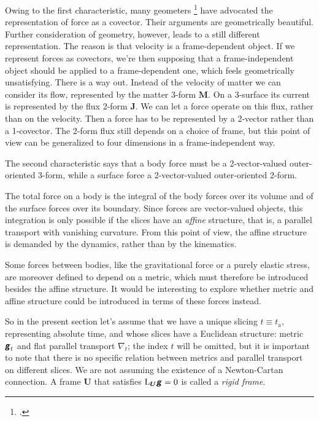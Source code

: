 \documentclass[\ifafour a4paper,12pt,\else a5paper,10pt,\fi%
onecolumn,oneside,article,%
british%
]{memoir}
\theoremstyle{remark}
\theoremstyle{innote}
\newcommand*{\mathte}[1]{\textbf{\textit{\textsf{#1}}}}
\newcommand*{\citep}{\footcites}
\renewcommand*{\|}[1][]{\nonscript\,#1\vert\nonscript\;\mathopen{}}
\newcommand*{\Li}{\mathrm{L}}
\newcommand*{\yrr}{M}
\newcommand*{\yr}{\bm{\yrr}}
\newcommand*{\ytn}{t_{\textrm{a}}}
\newcommand*{\yjj}{J}
\newcommand*{\yj}{\bm{\yjj}}
\newcommand*{\yFF}{U}
\newcommand*{\yF}{\bm{\yFF}}
\newcommand*{\ygg}{g}
\newcommand*{\yg}{\mathte{\ygg}}
\newcommand*{\ynab}{\nabla}
\begin{document}
Owing to the first characteristic, many geometers
\citep{vandantzig1954,burke1980b,burke1985_r1987,burke1995,bossavit1991,bossavit1998b,hehletal1999,hehletal2003}
have advocated the representation of force as a covector. Their arguments
are geometrically beautiful. Further consideration of geometry, however,
leads to a still different representation. The reason is that velocity is a
frame-dependent object. If we represent forces as covectors, we're then
supposing that a frame-independent object should be applied to a
frame-dependent one, which feels geometrically unsatisfying. There is a way
out. Instead of the velocity of matter we can consider its flow,
represented by the matter 3-form $\yr$. On a 3-surface its current is
represented by the flux 2-form $\yj$. We can let a force operate on this
flux, rather than on the velocity. Then a force has to be represented by a
2-vector rather than a 1-covector. The 2-form flux still depends on a
choice of frame, but this point of view can be generalized to four
dimensions in a frame-independent way.

The second characteristic says that a body force must be a 2-vector-valued
outer-oriented 3-form, while a surface force a 2-vector-valued
outer-oriented 2-form.

The total force on a body is the integral of the body forces over its
volume and of the surface forces over its boundary. Since forces are
vector-valued objects, this integration is only possible if the slices
have an \emph{affine} structure, that is, a parallel transport with
vanishing curvature. From this point of view, the affine structure is
demanded by the dynamics, rather than by the kinematics.

Some forces between bodies, like the gravitational force or a purely
elastic stress, are moreover defined to depend on a metric, which must
therefore be introduced besides the affine structure. It would be
interesting to explore whether metric and affine structure could be
introduced in terms of these forces instead.

So in the present section let's assume that we have a unique slicing
$t\equiv\ytn$, representing absolute time, and whose slices have a
Euclidean structure: metric $\yg_t$ and flat parallel transport $\ynab_t$;
the index $t$ will be omitted, but it is important to note that there is no
specific relation between metrics and parallel transport on different
slices. We are not assuming the existence of a Newton-Cartan connection. A
frame $\yF$ that satisfies $\Li_{\yF}\yg = 0$ is called a \emph{rigid
  frame}.
\end{document}
